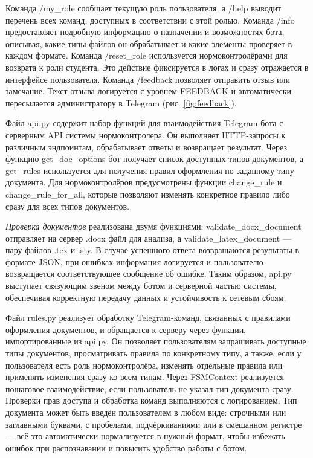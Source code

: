 \documentclass{report}
\begin{document}

Команда /my\_role сообщает текущую роль пользователя, а /help выводит перечень всех команд, доступных в соответствии с этой ролью. Команда /info предоставляет подробную информацию о назначении и возможностях бота, описывая, какие типы файлов он обрабатывает и какие элементы проверяет в каждом формате. Команда /reset\_role используется нормоконтролёрами для возврата к роли студента. Это действие фиксируется в логах и сразу отражается в интерфейсе пользователя. Команда /feedback позволяет отправить отзыв или замечание. Текст отзыва логируется с уровнем FEEDBACK и автоматически пересылается администратору в Telegram (рис. \ref{fig:feedback}). 


Файл api.py содержит набор функций для взаимодействия Telegram-бота с серверным API системы нормоконтролера. Он выполняет HTTP-запросы к различным эндпоинтам, обрабатывает ответы и возвращает результат. Через функцию get\_doc\_options бот получает список доступных типов документов, а get\_rules используется для получения правил оформления по заданному типу документа. Для нормоконтролёров предусмотрены функции change\_rule и change\_rule\_for\_all, которые позволяют изменять конкретное правило либо сразу для всех типов документов.

{\it Проверка документов} реализована двумя функциями: validate\_docx\_document отправляет на сервер .docx файл для анализа, а validate\_latex\_document — пару файлов .tex и .sty. В случае успешного ответа возвращаются результаты в формате JSON, при ошибках информация логируется и пользователю возвращается соответствующее сообщение об ошибке. Таким образом, api.py выступает связующим звеном между ботом и серверной частью системы, обеспечивая корректную передачу данных и устойчивость к сетевым сбоям.

Файл rules.py реализует обработку Telegram-команд, связанных с правилами оформления документов, и обращается к серверу через функции, импортированные из api.py. Он позволяет пользователям запрашивать доступные типы документов, просматривать правила по конкретному типу, а также, если у пользователя есть роль нормоконтролёра, изменять отдельные правила или применять изменения сразу ко всем типам. Через FSMContext реализуется пошаговое взаимодействие, если пользователь не указал тип документа сразу. Проверки прав доступа и обработка команд выполняются с логированием. Тип документа может быть введён пользователем в любом виде: строчными или заглавными буквами, с пробелами, подчёркиваниями или в смешанном регистре — всё это автоматически нормализуется в нужный формат, чтобы избежать ошибок при распознавании и повысить удобство работы с ботом.
\end{document}
